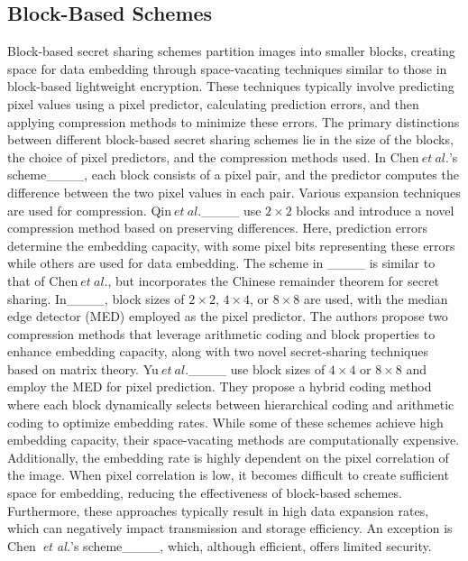 \subsection{Block-Based Schemes}
Block-based secret sharing schemes partition images into smaller blocks, creating space for data embedding through space-vacating techniques similar to those in block-based lightweight encryption. These techniques typically involve predicting pixel values using a pixel predictor, calculating prediction errors,  and then applying compression methods to minimize these errors. The primary distinctions between different block-based secret sharing schemes lie in the size of the blocks, the choice of pixel predictors, and the compression methods used. In Chen$~et~al.$'s scheme____, each block consists of a pixel pair, and the predictor computes the difference between the two pixel values in each pair. Various expansion techniques are used for compression.  Qin$~et~al.$____ use $2 \times 2$ blocks and introduce a novel compression method based on preserving differences. Here, prediction errors determine the embedding capacity, with some pixel bits representing these errors while others are used for data embedding. The scheme in ____ is similar to that of Chen$~et~al.$, but incorporates the Chinese remainder theorem for secret sharing. In____, block sizes of $2 \times 2$, $4 \times 4$, or $8 \times 8$ are used, with the median edge detector (MED) employed as the pixel predictor. The authors propose two compression methods that leverage arithmetic coding and block properties to enhance embedding capacity, along with two novel secret-sharing techniques based on matrix theory. Yu$~et~al.$____ use block sizes of $4 \times 4$ or $8 \times 8$ and employ the MED for pixel prediction. They propose a hybrid coding method where each block dynamically selects between hierarchical coding and arithmetic coding to optimize embedding rates. While some of these schemes achieve high embedding capacity, their space-vacating methods are computationally expensive. Additionally, the embedding rate is highly dependent on the pixel correlation of the image. When pixel correlation is low, it becomes difficult to create sufficient space for embedding, reducing the effectiveness of block-based schemes. Furthermore, these approaches typically result in high data expansion rates, which can negatively impact transmission and storage efficiency. An exception is Chen~\textit{et al.}'s scheme____, which, although efficient, offers limited security.

